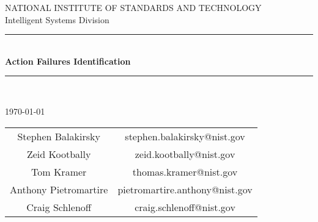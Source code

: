 \begin{titlepage}
\begin{center}

\LARGE{NATIONAL INSTITUTE OF STANDARDS AND TECHNOLOGY}\\
\vspace{1.5cm} %
\Large{Intelligent Systems Division}\\

\vspace{2cm} %
\rule[1ex]{1\textwidth}{0.3mm} \\%
\huge{\textbf{Action Failures Identification}}\\
\rule[1ex]{1\textwidth}{0.3mm} \\%

\vspace{1.0cm} %

{\large \today}
\vspace{1.0cm} %

\begin{tabular}{cc}
{\small Stephen Balakirsky} & {\small stephen.balakirsky@nist.gov}  \\
{\small Zeid Kootbally} & {\small zeid.kootbally@nist.gov} \\
{\small Tom Kramer} & {\small thomas.kramer@nist.gov} \\
{\small Anthony Pietromartire} & {\small pietromartire.anthony@nist.gov}  \\
{\small Craig Schlenoff} & {\small craig.schlenoff@nist.gov}
\end{tabular}


\end{center}
\end{titlepage}
\cleardoublepage
